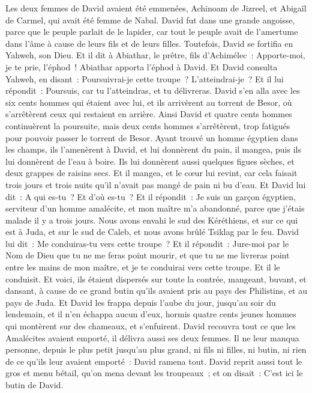 \begin{multicols}{2}
Les deux femmes de David avaient été emmenées, Achinoam de Jizreel, et Abigaïl de Carmel, qui avait été femme de Nabal.
David fut dans une grande angoisse, parce que le peuple parlait de le lapider, car tout le peuple avait de l'amertume dans l'âme à cause de leurs fils et de leurs filles. Toutefois, David se fortifia en Yahweh, son Dieu.
Et il dit à Abiathar, le prêtre, fils d'Achimélec~: Apporte-moi, je te prie, l'éphod~! Abiathar apporta l'éphod à David.
Et David consulta Yahweh, en disant~: Poursuivrai-je cette troupe~? L'atteindrai-je~? Et il lui répondit~: Poursuis, car tu l'atteindras, et tu délivreras.
David s'en alla avec les six cents hommes qui étaient avec lui, et ils arrivèrent au torrent de Besor, où s'arrêtèrent ceux qui restaient en arrière.
Ainsi David et quatre cents hommes continuèrent la poursuite, mais deux cents hommes s'arrêtèrent, trop fatigués pour pouvoir passer le torrent de Besor.
Ayant trouvé un homme égyptien dans les champs, ils l'amenèrent à David, et lui donnèrent du pain, il mangea, puis ils lui donnèrent de l'eau à boire.
Ils lui donnèrent aussi quelques figues sèches, et deux grappes de raisins secs. Et il mangea, et le cœur lui revint, car cela faisait trois jours et trois nuits qu'il n'avait pas mangé de pain ni bu d'eau.
Et David lui dit~: A qui es-tu~? Et d'où es-tu~? Et il répondit~: Je suis un garçon égyptien, serviteur d'un homme amalécite, et mon maître m'a abandonné, parce que j'étais malade il y a trois jours.
Nous avons envahi le sud des Kéréthiens, et sur ce qui est à Juda, et sur le sud de Caleb, et nous avons brûlé Tsiklag par le feu.
David lui dit~: Me conduiras-tu vers cette troupe~? Et il répondit~: Jure-moi par le Nom de Dieu que tu ne me feras point mourir, et que tu ne me livreras point entre les mains de mon maître, et je te conduirai vers cette troupe.
Et il le conduisit. Et voici, ils étaient dispersés sur toute la contrée, mangeant, buvant, et dansant, à cause de ce grand butin qu'ils avaient pris au pays des Philistins, et au pays de Juda.
Et David les frappa depuis l'aube du jour, jusqu'au soir du lendemain, et il n'en échappa aucun d'eux, hormis quatre cents jeunes hommes qui montèrent sur des chameaux, et s'enfuirent.
David recouvra tout ce que les Amalécites avaient emporté, il délivra aussi ses deux femmes.
Il ne leur manqua personne, depuis le plus petit jusqu'au plus grand, ni fils ni filles, ni butin, ni rien de ce qu'ils leur avaient emporté~: David ramena tout.
David reprit aussi tout le gros et menu bétail, qu'on mena devant les troupeaux~; et on disait~: C'est ici le butin de David.

\end{multicols}
